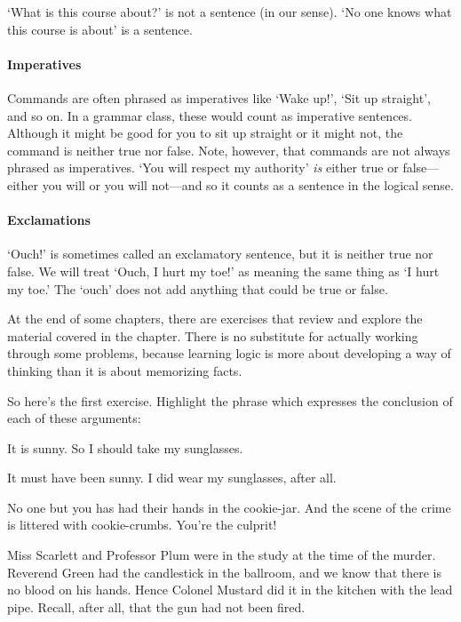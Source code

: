 `What is this course about?' is not a sentence (in our sense). `No one knows what this course is about' is a sentence.

\paragraph{Imperatives} Commands are often phrased as imperatives like `Wake up!', `Sit up straight', and so on. In a grammar class, these would count as imperative sentences. Although it might be good for you to sit up straight or it might not, the command is neither true nor false. Note, however, that commands are not always phrased as imperatives. `You will respect my authority' \emph{is} either true or false---either you will or you will not---and so it counts as a sentence in the logical sense.

\paragraph{Exclamations} `Ouch!' is sometimes called an exclamatory sentence, but it is neither true nor false. We will treat `Ouch, I hurt my toe!' as meaning the same thing as `I hurt my toe.' The `ouch' does not add anything that could be true or false.


\practiceproblems
At the end of some chapters, there are exercises that review and explore the material covered in the chapter. There is no substitute for actually working through some problems, because learning logic is more about developing a way of thinking than it is about memorizing facts.

\medskip

So here's the first exercise. Highlight the phrase which expresses the conclusion of each of these arguments:
\begin{compactlist}
	\item It is sunny. So I should take my sunglasses.
	\item It must have been sunny. I did wear my sunglasses, after all.
	\item No one but you has had their hands in the cookie-jar. And the scene of the crime is littered with cookie-crumbs. You're the culprit!
	\item Miss Scarlett and Professor Plum were in the study at the
	time of the murder. Reverend Green had the candlestick in the
	ballroom, and we know that there is no blood on his hands. Hence
	Colonel Mustard did it in the kitchen with the lead pipe.
	Recall, after all, that the gun had not been fired.
\end{compactlist}



